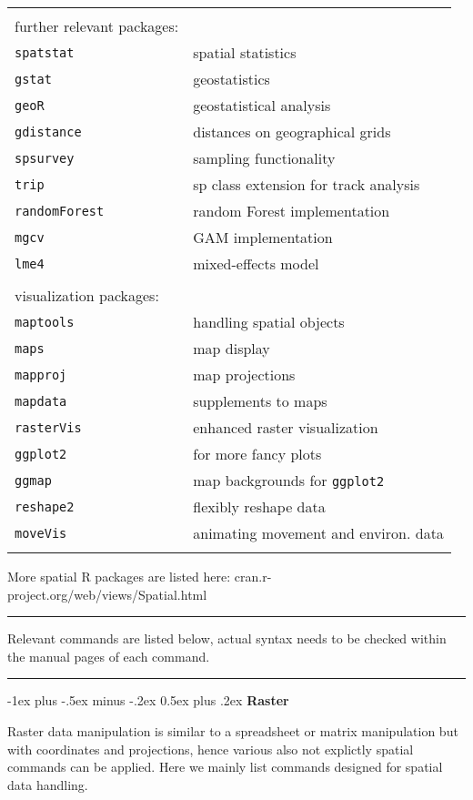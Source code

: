 \documentclass[a4paper,10pt,landscape]{article}
\makeatletter
\renewcommand{\section}{\@startsection{section}{1}{0mm}%
                                {-1ex plus -.5ex minus -.2ex}%
                                {0.5ex plus .2ex}%
                                {\normalfont\large\bfseries}}
\makeatother
\begin{document}
\begin{multicols}{3}
\begin{tabular}{@{}p{\the\MyLen}%
		@{}p{\linewidth-\the\MyLen}@{}}
& \\
further relevant packages:\\
% 
\verb!spatstat!  & spatial statistics\\
\verb!gstat!  & geostatistics\\
\verb!geoR!  & geostatistical analysis\\
\verb!gdistance!  & distances on geographical grids\\
\verb!spsurvey!  & sampling functionality\\
\verb!trip!  & sp class extension for track analysis\\
\verb!randomForest!  & random Forest implementation\\
\verb!mgcv!  & GAM implementation\\
\verb!lme4!  & mixed-effects model\\
% 
& \\
visualization packages:\\
\verb!maptools!  & handling spatial objects\\
\verb!maps!  & map display\\
\verb!mapproj!  & map projections\\
\verb!mapdata!  & supplements to maps\\
\verb!rasterVis!  & enhanced raster visualization\\
\verb!ggplot2!  & for more fancy plots\\
\verb!ggmap!  & map backgrounds for \verb!ggplot2!\\
\verb!reshape2!  & flexibly reshape data \\
\verb!moveVis!  & animating movement and environ. data \\
 & 
\end{tabular}

More spatial R packages are listed here: cran.r-project.org/web/views/Spatial.html

\rule{0.32\textwidth}{0.4pt}
Relevant commands are listed below, actual syntax needs to be checked within the manual pages of each command. 
\rule{0.32\textwidth}{0.4pt}



\section{\textbf{Raster}}

Raster data manipulation is similar to a spreadsheet or matrix manipulation but with coordinates and projections, hence various also not explictly spatial commands can be applied. Here we  mainly list commands designed for spatial data handling.


\end{multicols}
\end{document}

